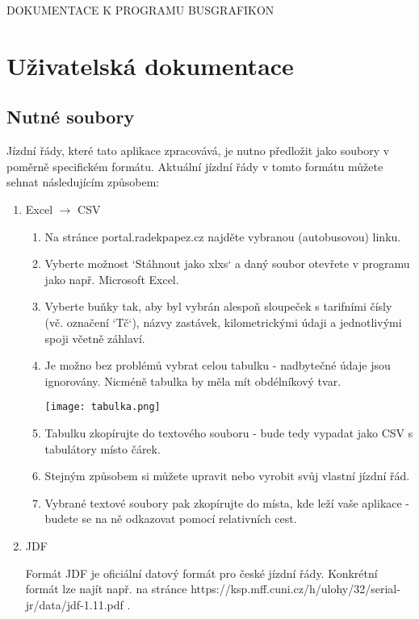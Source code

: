 \documentclass[14pt]{article}
\begin{document}
\begin{center}
  \uppercase{Dokumentace k programu BusGrafikon}
\end{center}

\section{Uživatelská dokumentace}

\subsection{Nutné soubory}


Jízdní řády, které tato aplikace zpracovává, je nutno předložit jako soubory v poměrně specifickém formátu. Aktuální jízdní řády v tomto formátu můžete sehnat následujícím způsobem:
\begin{enumerate}[label=(\alph*)]
\item Excel $\rightarrow$ CSV

\begin{enumerate}
\item Na stránce portal.radekpapez.cz najděte vybranou (autobusovou) linku.
\item Vyberte možnost `Stáhnout jako xlxs` a daný soubor otevřete v programu jako např. Microsoft Excel.
\item Vyberte buňky tak, aby byl vybrán alespoň sloupeček s tarifními čísly (vč. označení `Tč`), názvy zastávek, kilometrickými údaji a jednotlivými spoji včetně záhlaví.
\item Je možno bez problémů vybrat celou tabulku - nadbytečné údaje jsou ignorovány. Nicméně tabulka by měla mít obdélníkový tvar. 

\begin{center}
\texttt{[image: tabulka.png]}
\end{center}


\item Tabulku zkopírujte do textového souboru - bude tedy vypadat jako CSV s tabulátory místo čárek.
\item Stejným způsobem si můžete upravit nebo vyrobit svůj vlastní jízdní řád.
\item Vybrané textové soubory pak zkopírujte do místa, kde leží vaše aplikace - budete se na ně odkazovat pomocí relativních cest.
\end{enumerate}
\item JDF

Formát JDF je oficiální datový formát pro české jízdní řády. Konkrétní formát lze najít např. na stránce https://ksp.mff.cuni.cz/h/ulohy/32/serial-jr/data/jdf-1.11.pdf .


\end{enumerate}
\end{document}
